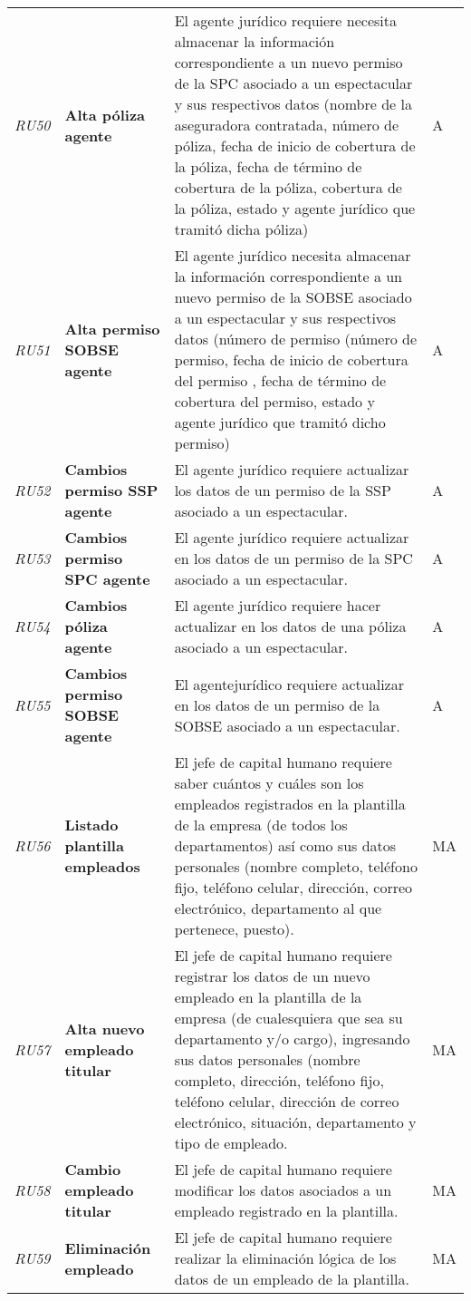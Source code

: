 \begin{longtable}[H]{m{1cm}m{3cm}m{10cm}m{1cm}}
\textit{RU50} &\textbf{Alta póliza agente} & El agente jurídico requiere necesita almacenar la información correspondiente a un nuevo permiso de la SPC asociado a un espectacular y sus respectivos datos (nombre de la aseguradora contratada, número de póliza, fecha de inicio de cobertura de la póliza, fecha de término de cobertura de la póliza, cobertura de la póliza, estado y agente jurídico que tramitó dicha póliza) & A\tabularnewline
\textit{RU51} &\textbf{Alta permiso SOBSE agente} & El agente jurídico necesita almacenar la información correspondiente a un nuevo permiso de la SOBSE asociado a un espectacular y sus respectivos datos (número de permiso (número de permiso, fecha de inicio de cobertura del permiso , fecha de término de cobertura del permiso, estado y agente jurídico que tramitó dicho permiso) & A\tabularnewline
\textit{RU52} &\textbf{Cambios permiso SSP agente} & El agente jurídico requiere actualizar los datos de un permiso de la SSP asociado a un espectacular. & A\tabularnewline
\textit{RU53} &\textbf{Cambios permiso SPC agente} & El agente jurídico requiere actualizar en los datos de un permiso de la SPC asociado a un espectacular. & A\tabularnewline
\textit{RU54} &\textbf{Cambios póliza agente} & El agente jurídico requiere hacer actualizar en los datos de una póliza asociado a un espectacular. & A\tabularnewline
\textit{RU55} &\textbf{Cambios permiso SOBSE agente} & El agentejurídico requiere actualizar en los datos de un permiso de la SOBSE asociado a un espectacular. & A
\tabularnewline
\textit{RU56} & \textbf{Listado plantilla empleados} & El jefe de capital humano requiere saber cuántos y cuáles son los empleados registrados en la plantilla de la empresa (de todos los departamentos) así como sus datos personales (nombre completo, teléfono fijo, teléfono celular, dirección, correo electrónico, departamento al que pertenece, puesto). & MA\tabularnewline
\textit{RU57} & \textbf{Alta nuevo empleado titular} & El jefe de capital humano requiere registrar los datos de un nuevo empleado en la plantilla de la empresa (de cualesquiera que sea su departamento y/o cargo), ingresando sus datos personales (nombre completo, dirección, teléfono fijo, teléfono celular, dirección de correo electrónico, situación, departamento y tipo de empleado.\ & MA\tabularnewline
\textit{RU58} & \textbf{Cambio empleado titular} & El jefe de capital humano requiere modificar los datos asociados a un empleado registrado en la plantilla. & MA\tabularnewline
\textit{RU59} & \textbf{Eliminación empleado} & El jefe de capital humano requiere realizar la eliminación lógica de los datos de un empleado de la plantilla. & MA \tabularnewline

\end{longtable}
